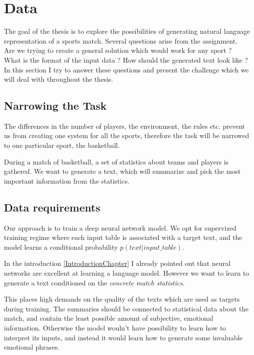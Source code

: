 \chapter{Data} \label{chapter:data}

The goal of the thesis is to explore the possibilities of generating natural language representation of a sports match. Several questions arise from the assignment. Are we trying to create a general solution which would work for any sport ? What is the format of the input data ? How should the generated text look like ? In this section I try to answer these questions and present the challenge which we will deal with throughout the thesis.

\section{Narrowing the Task}
The differences in the number of players, the environment, the rules etc. prevent us from creating one system for all the sports, therefore the task will be narrowed to one particular sport, the basketball.

During a match of basketball, a set of statistics about teams and players is gathered. We want to generate a text, which will summarize and pick the most important information from the statistics.

\section{Data requirements} \label{data_requirements_section}

Our approach is to train a deep neural network model. We opt for supervized training regime where each input table is associated with a target text, and the model learns a conditional probability $p(text | input\_table)$. 

In the introduction \ref{IntroductionChapter} I already pointed out that neural networks are excellent at learning a language model. However we want to learn to generate a text conditioned on the \emph{concrete match statistics}.

This places high demands on the quality of the texts which are used as targets during training. The summaries should be connected to statistical data about the match, and contain the least possible amount of subjective, emotional information. Otherwise the model wouln't have possibility to learn how to interpret its inputs, and instead it would learn how to generate some invaluable emotional phrases.

